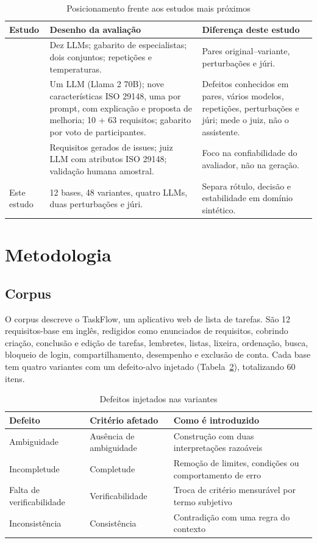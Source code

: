 \documentclass[12pt]{article}
\begin{document}
\begin{table}[ht]
\centering
\caption{Posicionamento frente aos estudos mais próximos}
\label{tab:relacionados}
\small
\begin{tabularx}{\textwidth}{@{}lXX@{}}
\toprule
Estudo & Desenho da avaliação & Diferença deste estudo \\
\midrule
\citet{shefa2026} & Dez LLMs; gabarito de especialistas; dois conjuntos; repetições e temperaturas. & Pares original--variante, perturbações e júri. \\
\citet{lubos2024} & Um LLM (Llama 2 70B); nove características ISO 29148, uma por prompt, com explicação e proposta de melhoria; 10 + 63 requisitos; gabarito por voto de participantes. & Defeitos conhecidos em pares, vários modelos, repetições, perturbações e júri; mede o juiz, não o assistente. \\
\citet{paiva2026} & Requisitos gerados de issues; juiz LLM com atributos ISO 29148; validação humana amostral. & Foco na confiabilidade do avaliador, não na geração. \\
Este estudo & 12 bases, 48 variantes, quatro LLMs, duas perturbações e júri. & Separa rótulo, decisão e estabilidade em domínio sintético. \\
\bottomrule
\end{tabularx}
\end{table}

\section{Metodologia}

\subsection{Corpus}

O corpus descreve o TaskFlow, um aplicativo web de lista de tarefas. São 12 requisitos-base em inglês, redigidos como enunciados de requisitos, cobrindo criação, conclusão e edição de tarefas, lembretes, listas, lixeira, ordenação, busca, bloqueio de login, compartilhamento, desempenho e exclusão de conta. Cada base tem quatro variantes com um defeito-alvo injetado (Tabela~\ref{tab:defeitos}), totalizando 60 itens.

\begin{table}[ht]
\centering
\caption{Defeitos injetados nas variantes}
\label{tab:defeitos}
\small
\begin{tabularx}{\textwidth}{@{}llX@{}}
\toprule
Defeito & Critério afetado & Como é introduzido \\
\midrule
Ambiguidade & Ausência de ambiguidade & Construção com duas interpretações razoáveis \\
Incompletude & Completude & Remoção de limites, condições ou comportamento de erro \\
Falta de verificabilidade & Verificabilidade & Troca de critério mensurável por termo subjetivo \\
Inconsistência & Consistência & Contradição com uma regra do contexto \\
\bottomrule
\end{tabularx}
\end{table}
\end{document}

